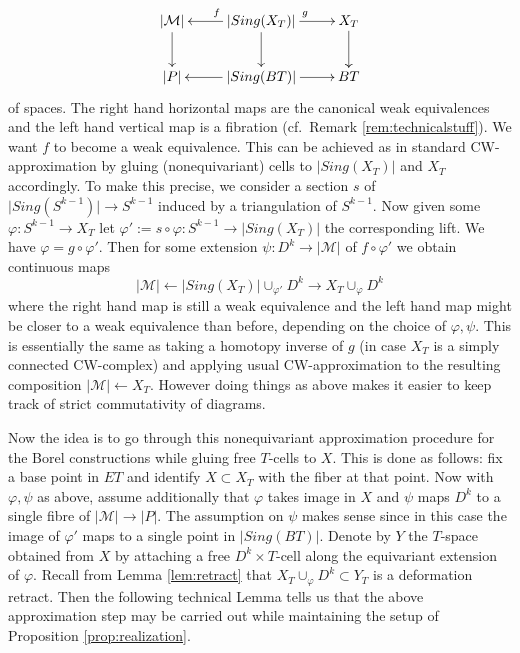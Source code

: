 \documentclass[12pt,a4paper]{article}
\theoremstyle{definition}
\begin{document}
\[\xymatrix{\vert \mathcal{M}\vert \ar[d]&\ar[d]\ar[l]_f \vert Sing(X_T)\vert\ar[r]^g &\ar[d] X_T\\
\vert P \vert & \vert Sing (BT)\vert\ar[l]\ar[r] & BT
}\]
of spaces. The right hand horizontal maps are the canonical weak equivalences and the left hand vertical map is a fibration (cf.\ Remark \ref{rem:technicalstuff}). We want $f$ to become a weak equivalence. This can be achieved as in standard CW-approximation by gluing (nonequivariant) cells to $\vert Sing(X_T)\vert$ and $X_T$ accordingly. To make this precise, we consider a section $s$ of $\vert Sing(S^{k-1})\vert\rightarrow S^{k-1}$ induced by a triangulation of $S^{k-1}$.
Now given some $\varphi\colon S^{k-1}\rightarrow X_T$ let $\varphi':=s\circ\varphi\colon S^{k-1}\rightarrow \vert Sing(X_T)\vert$ the corresponding lift. We have $\varphi=g\circ\varphi'$. Then for some extension $\psi\colon D^k\rightarrow\vert \mathcal{M}\vert$ of $f\circ \varphi'$ we obtain continuous maps
\[\vert\mathcal{M}\vert\leftarrow \vert Sing(X_T)\vert\cup_{\varphi'} D^k \rightarrow X_T\cup_\varphi D^k\]
where the right hand map is still a weak equivalence and the left hand map might be closer to a weak equivalence than before, depending on the choice of $\varphi,\psi$. This is essentially the same as taking a homotopy inverse of $g$ (in case $X_T$ is a simply connected CW-complex) and applying usual CW-approximation to the resulting composition $\vert \mathcal{M}\vert \leftarrow X_T$. However doing things as above makes it easier to keep track of strict commutativity of diagrams.

Now the idea is to go through this nonequivariant approximation procedure for the Borel constructions while gluing free $T$-cells to $X$.
This is done as follows: fix a base point in $ET$ and identify $X\subset X_T$ with the fiber at that point. Now with $\varphi,\psi$ as above, assume additionally that $\varphi$ takes image in $X$ and $\psi$ maps $D^k$ to a single fibre of $\vert \mathcal{M}\vert\rightarrow \vert P\vert$. The assumption on $\psi$ makes sense since in this case the image of $\varphi'$ maps to a single point in $\vert Sing(BT)\vert$. Denote by $Y$ the $T$-space obtained from $X$ by attaching a free $D^k\times T$-cell along the equivariant extension of $\varphi$. Recall from Lemma \ref{lem:retract} that $X_T\cup_\varphi D^k\subset Y_T$ is a deformation retract. Then the following technical Lemma tells us that the above approximation step may be carried out while maintaining the setup of Proposition \ref{prop:realization}.
\end{document}
